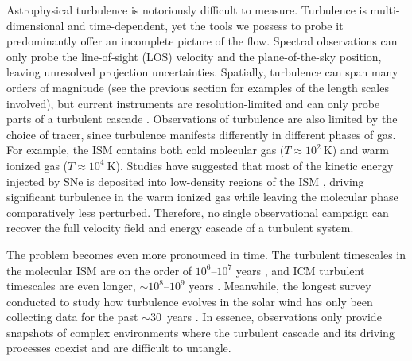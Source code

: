 Astrophysical turbulence is notoriously difficult to measure. 
Turbulence is multi-dimensional and time-dependent, yet the tools we possess to probe it predominantly offer an incomplete picture of the flow.
Spectral observations can only probe the line-of-sight (LOS) velocity and the plane-of-the-sky position, leaving unresolved projection uncertainties.
Spatially, turbulence can span many orders of magnitude (see the previous section for examples of the length scales involved), but current instruments are resolution-limited and can only probe parts of a turbulent cascade \citep[e.g.,][]{hitomi_collaboration_atmospheric_2018,churazov_x-ray_2012}.
Observations of turbulence are also limited by the choice of tracer, since turbulence manifests differently in different phases of gas. 
For example, the ISM contains both cold molecular gas ($T \approx 10^2\ \mathrm{K}$) and warm ionized gas ($T \approx 10^4\ \mathrm{K}$). 
Studies have suggested that most of the kinetic energy injected by SNe is deposited into low-density regions of the ISM \citep[see, e.g.,][]{kim_momentum_2015,padoan_supernova_2016}, driving significant turbulence in the warm ionized gas while leaving the molecular phase comparatively less perturbed.
Therefore, no single observational campaign can recover the full velocity field and energy cascade of a turbulent system.

The problem becomes even more pronounced in time.
The turbulent timescales in the molecular ISM are on the order of $10^6$--$10^7$ years \citep{sun_molecular_2022}, and ICM turbulent timescales are even longer, $\sim 10^8$--$10^9$ years \citep{hitomi_collaboration_atmospheric_2018}. 
Meanwhile, the longest survey conducted to study how turbulence evolves in the solar wind has only been collecting data for the past $\sim 30$\ years \citep{wilson_quarter_2021}.
In essence, observations only provide snapshots of complex environments where the turbulent cascade and its driving processes coexist and are difficult to untangle.

